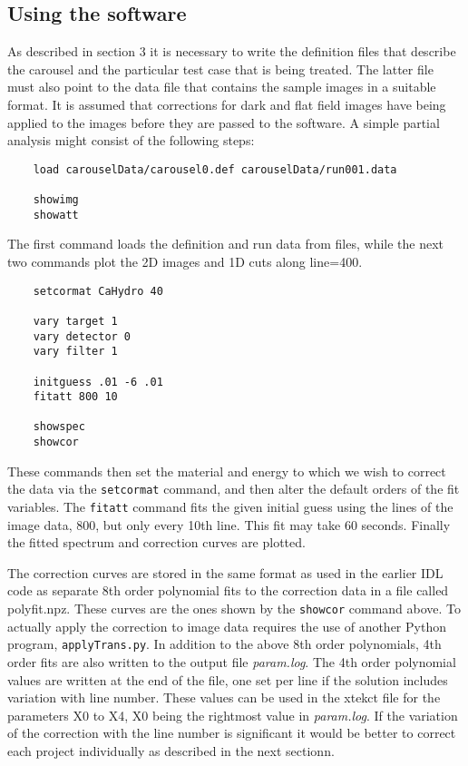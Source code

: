 \documentclass[a4paper,12pt]{article}
\begin{document}
\subsection{Using the software}

As described in section 3 it is necessary to write the definition files that describe the carousel and the particular
test case that is being treated.
The latter file must also point to the data file that contains the sample images in a suitable format.
It is assumed that corrections for dark and flat field images have being applied to the images before they are
passed to the software.
A simple partial analysis might consist of the following steps:
\begin{verbatim}
    load carouselData/carousel0.def carouselData/run001.data

    showimg
    showatt
\end{verbatim}
The first command loads the definition and run data from files, while the next two commands
plot the 2D images and 1D cuts along line=400.

\begin{verbatim}
    setcormat CaHydro 40

    vary target 1
    vary detector 0
    vary filter 1

    initguess .01 -6 .01
    fitatt 800 10

    showspec
    showcor
\end{verbatim}
These commands then set the material and energy to which we wish to correct the data via the \texttt{setcormat}
command, and then alter the default orders of the fit variables.
The \texttt{fitatt} command fits the given initial guess using the lines of the image data, 800, but only every
10th line.
This fit may take 60 seconds. Finally the fitted spectrum and correction curves are plotted.

The correction curves are stored in the same format as used in the earlier IDL code as separate 8th order polynomial
fits to the correction data in a file called polyfit.npz.
These curves are the ones shown by the \texttt{showcor} command above.
To actually apply the correction to image data requires the use of another Python program, \texttt{applyTrans.py}.
In addition to the above 8th order polynomials, 4th order fits are also written to the
output file \textit{param.log}.
The 4th order polynomial values are written at the end of the file, one set per line if the solution includes
variation with line number.
These values can be used in the xtekct file for the parameters X0 to X4, X0 being the rightmost value in
\textit{param.log}.
If the variation of the correction with the line number is significant it would be better to correct
each project individually as described in the next sectionn.
\end{document}
